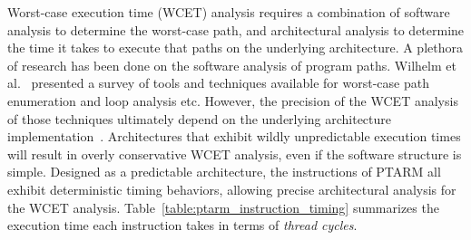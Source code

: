 \label{subsec:precision_timing_inst_ptarm}
Worst-case execution time (WCET) analysis requires a combination of software analysis to determine the worst-case path, and architectural analysis to determine the time it takes to execute that paths on the underlying architecture. 
A plethora of research has been done on the software analysis of program paths. 
Wilhelm et al.~\cite{wilhelm-survey-paper} presented a survey of tools and techniques available for worst-case path enumeration and loop analysis etc.
However, the precision of the WCET analysis of those techniques ultimately depend on the underlying architecture implementation~\cite{Heckmann2003processor}.
Architectures that exhibit wildly unpredictable execution times will result in overly conservative WCET analysis, even if the software structure is simple. 
Designed as a predictable architecture, the instructions of PTARM all exhibit deterministic timing behaviors, allowing precise architectural analysis for the WCET analysis.
Table~\ref{table:ptarm_instruction_timing} summarizes the execution time each instruction takes in terms of \emph{thread cycles}. 


